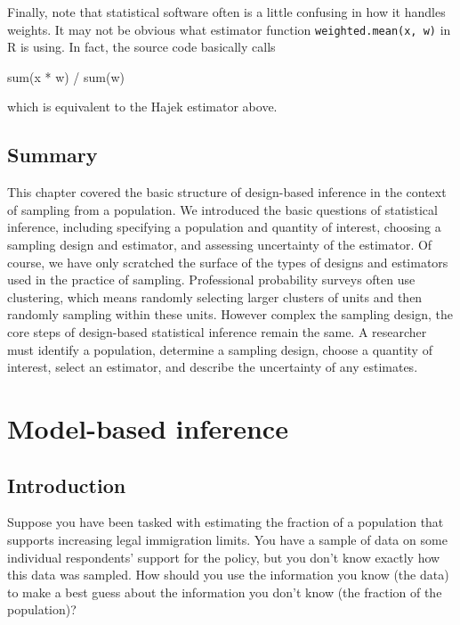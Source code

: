 \documentclass[
  13pt,
  letterpaper,
  DIV=11,
  numbers=noendperiod]{scrreprt}
\newenvironment{Shaded}{\begin{snugshade}}{\end{snugshade}}
\newcommand{\FunctionTok}[1]{\textcolor[rgb]{0.28,0.35,0.67}{#1}}
\newcommand{\NormalTok}[1]{\textcolor[rgb]{0.00,0.23,0.31}{#1}}
\newcommand{\SpecialCharTok}[1]{\textcolor[rgb]{0.37,0.37,0.37}{#1}}
\theoremstyle{plain}
\theoremstyle{plain}
\theoremstyle{definition}
\theoremstyle{definition}
\theoremstyle{remark}
\begin{document}
Finally, note that statistical software often is a little confusing in
how it handles weights. It may not be obvious what estimator function
\texttt{weighted.mean(x,\ w)} in R is using. In fact, the source code
basically calls

\begin{Shaded}
\begin{Highlighting}[]
\FunctionTok{sum}\NormalTok{(x }\SpecialCharTok{*}\NormalTok{ w) }\SpecialCharTok{/} \FunctionTok{sum}\NormalTok{(w)}
\end{Highlighting}
\end{Shaded}

which is equivalent to the Hajek estimator above.

\section{Summary}\label{summary}

This chapter covered the basic structure of design-based inference in
the context of sampling from a population. We introduced the basic
questions of statistical inference, including specifying a population
and quantity of interest, choosing a sampling design and estimator, and
assessing uncertainty of the estimator. Of course, we have only
scratched the surface of the types of designs and estimators used in the
practice of sampling. Professional probability surveys often use
clustering, which means randomly selecting larger clusters of units and
then randomly sampling within these units. However complex the sampling
design, the core steps of design-based statistical inference remain the
same. A researcher must identify a population, determine a sampling
design, choose a quantity of interest, select an estimator, and describe
the uncertainty of any estimates.

\chapter{Model-based inference}\label{sec-model-based}

\section{Introduction}\label{introduction-1}

Suppose you have been tasked with estimating the fraction of a
population that supports increasing legal immigration limits. You have a
sample of data on some individual respondents' support for the policy,
but you don't know exactly how this data was sampled. How should you use
the information you know (the data) to make a best guess about the
information you don't know (the fraction of the population)?
\end{document}
